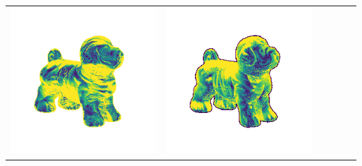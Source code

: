 \begin{tabularx}{\linewidth}{@{}Y@{}Y@{}Y@{}Y@{}Y@{}Y@{}}
\includegraphics[width=\linewidth]{semisynthetic/20160617_17_yu_err.png} &
\includegraphics[width=\linewidth]{semisynthetic/20160617_17_dpsn_err.png} &

\end{tabularx}

